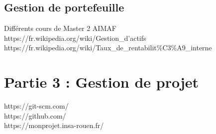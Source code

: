 \subsection{Gestion de portefeuille}
Différents cours de Master 2 AIMAF \\
\indent https://fr.wikipedia.org/wiki/Gestion\_d'actifs \\
\indent https://fr.wikipedia.org/wiki/Taux\_de\_rentabilit\%C3\%A9\_interne 

\section{Partie 3 : Gestion de projet}
https://git-scm.com/ \\
\indent https://github.com/ \\
\indent https://monprojet.insa-rouen.fr/ 

      